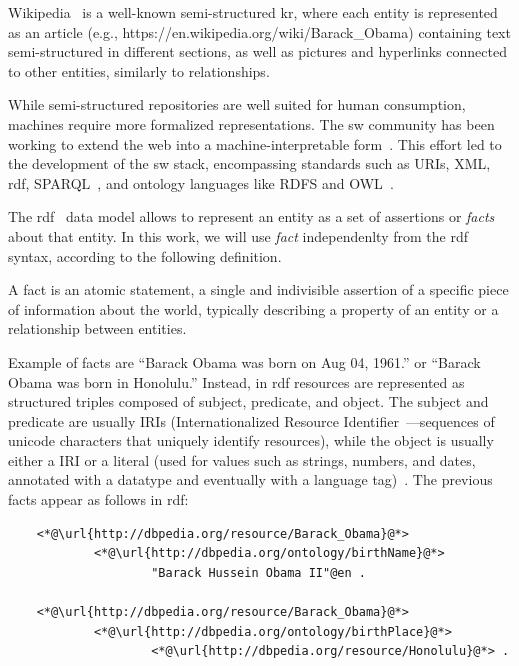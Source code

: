 Wikipedia~\cite{wikipedia} is a well-known semi-structured \acl{kr}, where each entity is represented as an article (e.g., https://en.wikipedia.org/wiki/Barack\_Obama) containing text semi-structured in different sections, as well as pictures and hyperlinks connected to other entities, similarly to relationships.

While semi-structured repositories are well suited for human consumption, machines require more formalized representations. The \Acl{sw} community has been working to extend the \acs{web} into a machine-interpretable form~\cite{entityorientedsearch2018,decker_sw_rdf_xml_roles_2000}. This effort led to the development of the \acl{sw} stack, encompassing standards such as URIs, XML, \acs{rdf}, SPARQL~\cite{prudhommeaux2008sparql}, and ontology languages like RDFS and OWL~\cite{entityorientedsearch2018}.

The \acf{rdf}~\cite{klyne2004rdf} data model allows to represent an entity as a set of assertions or \emph{facts} about that entity. In this work, we will use \emph{fact} independenlty from the \ac{rdf} syntax, according to the following definition.
\begin{definition}[Fact]
    A fact is an atomic statement, a single and indivisible assertion of a specific piece of information about the world, typically describing a property of an entity or a relationship between entities.
\end{definition}
Example of facts are ``Barack Obama was born on Aug 04, 1961.'' or ``Barack Obama was born in Honolulu.''
Instead, in \ac{rdf} resources are represented as structured triples composed of subject, predicate, and object. The subject and predicate are usually IRIs (Internationalized Resource Identifier~\cite{durst2005iri}---sequences of unicode characters that uniquely identify resources), while the object is usually either a IRI or a literal (used for values such as strings, numbers, and dates, annotated with a datatype and eventually with a language tag)~\cite{klyne2004rdf}.
%
The previous facts appear as follows in \ac{rdf}:
%
\begin{lstlisting}
    <*@\url{http://dbpedia.org/resource/Barack_Obama}@*>
            <*@\url{http://dbpedia.org/ontology/birthName}@*>
                    "Barack Hussein Obama II"@en .

    <*@\url{http://dbpedia.org/resource/Barack_Obama}@*>
            <*@\url{http://dbpedia.org/ontology/birthPlace}@*>
                    <*@\url{http://dbpedia.org/resource/Honolulu}@*> .
\end{lstlisting}

